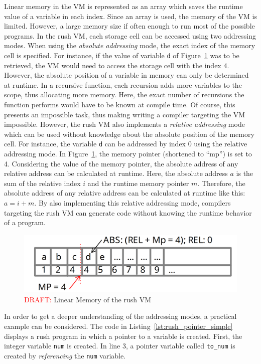 Linear memory in the VM is represented as an array which saves the runtime value of a variable in each index.
Since an array is used, the memory of the VM is limited.
However, a large memory size if often enough to run most of the possible programs.
In the rush VM, each storage cell can be accessed using two addressing modes.
When using the \emph{absolute addressing} mode, the exact index of the memory cell is specified.
For instance, if the value of variable \texttt{d} of Figure~\ref{fig:rush_vm_linmem} was to be retrieved, the VM would need to access the storage cell with the index 4.
However, the absolute position of a variable in memory can only be determined at runtime.
In a recursive function, each recursion adds more variables to the scope, thus allocating more memory.
Here, the exact number of recursions the function performs would have to be known at compile time.
Of course, this presents an impossible task, thus making writing a compiler targeting the VM impossible.
However, the rush VM also implements a \emph{relative addressing} mode which can be used without knowledge about the absolute position of the memory cell.
For instance, the variable \texttt{d} can be addressed by index 0 using the relative addressing mode.
In Figure~\ref{fig:rush_vm_linmem}, the memory pointer (shortened to \enquote{mp}) is set to 4.
Considering the value of the memory pointer, the absolute address of any relative address can be calculated at runtime.
Here, the absolute address $a$ is the sum of the relative index $i$ and the runtime memory pointer $m$.
Therefore, the absolute address of any relative address can be calculated at runtime like this: $a = i + m$.
By also implementing this relative addressing mode,
compilers targeting the rush VM can generate code without knowing the runtime behavior of a program.

\begin{figure}[h]
	\includegraphics[width=\textwidth]{./vm_linmem_draft.png}
	\caption{\textcolor{red}{DRAFT:} Linear Memory of the rush VM}\label{fig:rush_vm_linmem}
\end{figure}

In order to get a deeper understanding of the addressing modes, a practical example can be considered.
The code in Listing~\ref{lst:rush_pointer_simple} displays a rush program in which a pointer to a variable is created.
First, the integer variable \texttt{num} is created.
In line 3, a pointer variable called \texttt{to\_num} is created by \emph{referencing} the \texttt{num} variable.


